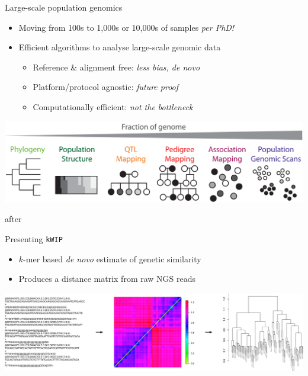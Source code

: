 \documentclass[t]{beamer}
\begin{document}
\begin{frame}{Large-scale population genomics}
  \begin{itemize}
    \item Moving from 100s to 1,000s or 10,000s of samples \textit{per PhD!}
      \pause
    \item Efficient algorithms to analyse large-scale genomic data
    \begin{itemize}
      \item Reference \& alignment free: \textit{less bias, de novo}
      \item Platform/protocol agnostic: \textit{future proof}
      \item Computationally efficient: \textit{not the bottleneck}
    \end{itemize}
  \end{itemize}
  \begin{center}
    \includegraphics[width=\textwidth]{img/cross-scale.png}
  \end{center}
  \tiny{after \textcite{peterson_double_2012}}
\end{frame}

\begin{frame}{Presenting \texttt{kWIP}}
  \begin{itemize}
    \item $k$-mer based \textit{de novo} estimate of genetic similarity
    \item Produces a distance matrix from raw NGS reads
  \end{itemize}
  \begin{center}
    \includegraphics[width=\textwidth]{img/kwip-overview.png}
  \end{center}
\end{frame}
\end{document}
